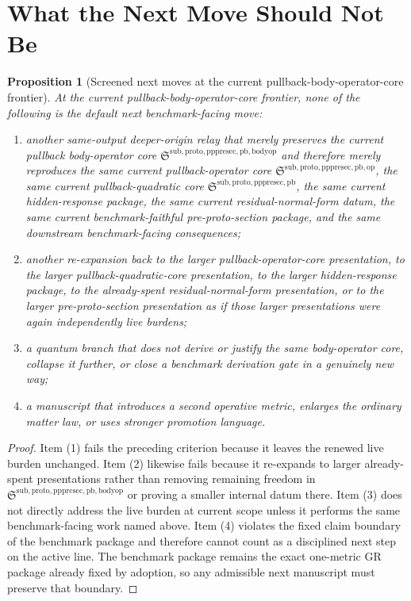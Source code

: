 \documentclass[11pt]{article}
\newcommand{\PrePreProtoSectionPullbackCore}{\mathfrak S^{\mathrm{sub,proto,pppresec,pb}}}
\newcommand{\PullbackOperatorCore}{\mathfrak S^{\mathrm{sub,proto,pppresec,pb,op}}}
\newcommand{\PullbackBodyOperatorCore}{\mathfrak S^{\mathrm{sub,proto,pppresec,pb,bodyop}}}
\newtheorem{proposition}{Proposition}
\begin{document}
\section{What the Next Move Should Not Be}

\begin{proposition}[Screened next moves at the current pullback-body-operator-core frontier]
At the current pullback-body-operator-core frontier, none of the following is the default next benchmark-facing move:
\begin{enumerate}
    \item another same-output deeper-origin relay that merely preserves the current pullback body-operator core \(\PullbackBodyOperatorCore\) and therefore merely reproduces the same current pullback-operator core \(\PullbackOperatorCore\), the same current pullback-quadratic core \(\PrePreProtoSectionPullbackCore\), the same current hidden-response package, the same current residual-normal-form datum, the same current benchmark-faithful pre-proto-section package, and the same downstream benchmark-facing consequences;
    \item another re-expansion back to the larger pullback-operator-core presentation, to the larger pullback-quadratic-core presentation, to the larger hidden-response package, to the already-spent residual-normal-form presentation, or to the larger pre-proto-section presentation as if those larger presentations were again independently live burdens;
    \item a quantum branch that does not derive or justify the same body-operator core, collapse it further, or close a benchmark derivation gate in a genuinely new way;
    \item a manuscript that introduces a second operative metric, enlarges the ordinary matter law, or uses stronger promotion language.
\end{enumerate}
\end{proposition}

\begin{proof}
Item (1) fails the preceding criterion because it leaves the renewed live burden unchanged. Item (2) likewise fails because it re-expands to larger already-spent presentations rather than removing remaining freedom in \(\PullbackBodyOperatorCore\) or proving a smaller internal datum there. Item (3) does not directly address the live burden at current scope unless it performs the same benchmark-facing work named above. Item (4) violates the fixed claim boundary of the benchmark package and therefore cannot count as a disciplined next step on the active line. The benchmark package remains the exact one-metric GR package already fixed by adoption, so any admissible next manuscript must preserve that boundary.
\end{proof}
\end{document}
